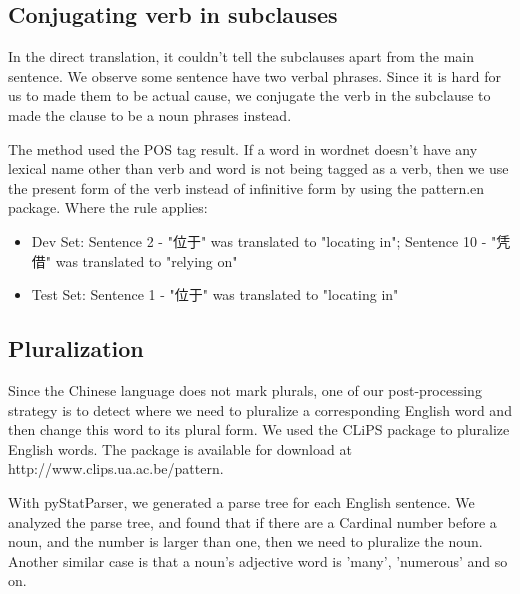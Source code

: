 \documentclass[11pt]{article} %
\begin{document}
\begin{CJK}{UTF8}{gbsn}
\subsection{Conjugating verb in subclauses}
In the direct translation, it couldn't tell the subclauses apart from the main sentence. We observe some sentence have two verbal phrases. Since it is hard for us to made them to be actual cause, we conjugate the verb in the subclause to made the clause to be a noun phrases instead. 

The method used the POS tag result. If a word in wordnet doesn't have any lexical name other than verb and word is not being tagged as a verb, then we use the present form of the verb instead of infinitive form by using the pattern.en package.
Where the rule applies:
\begin{itemize}
\item Dev Set: Sentence 2 - "位于" was translated to  "locating in"; Sentence 10 - "凭借"  was translated to  "relying on"
\item Test Set: Sentence 1 - "位于" was translated to  "locating in"
\end{itemize}

\subsection{Pluralization}
Since the Chinese language does not mark plurals, one of our post-processing strategy is to detect where we need to pluralize a corresponding English word and then change this word to its plural form. We used the CLiPS package to pluralize English words. The package is available for download at http://www.clips.ua.ac.be/pattern.

With pyStatParser, we generated a parse tree for each English sentence. We analyzed the parse tree, and found that if there are a Cardinal number before a noun, and the number is larger than one, then we need to pluralize the noun. Another similar case is that a noun's adjective word is 'many', 'numerous' and so on.


\end{CJK}
\end{document}
